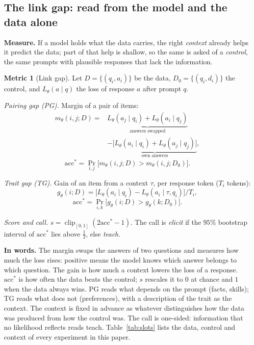 \documentclass{article}
\theoremstyle{definition}
\newtheorem{metric}{Metric}
\DeclareMathOperator{\clip}{clip}
\newcommand{\acc}{\mathrm{acc}^*}
\begin{document}
\subsection{The link gap: read from the model and the data alone}
\label{sec:metric}

\textbf{Measure.} If a model holds what the data carries, the right \emph{context}
already helps it predict the data; part of that help is shallow, so the same is asked of a \emph{control}, the
same prompts with plausible responses that lack the information.

\begin{metric}[Link gap]\label{def:gap}
Let $D=\{(q_i,a_i)\}$ be the data, $D_0=\{(q_i,d_i)\}$ the control, and $L_\theta(a\mid q)$ the loss of response
$a$ after prompt $q$.

\emph{Pairing gap (PG).} Margin of a pair of items:
\begin{align*}
m_\theta(i,j;D)={}&\underbrace{L_\theta(a_j\mid q_i)+L_\theta(a_i\mid q_j)}_{\text{answers swapped}}\\
&-\underbrace{\big[L_\theta(a_i\mid q_i)+L_\theta(a_j\mid q_j)\big]}_{\text{own answers}},
\end{align*}
\[ \acc=\Pr_{i,j}\big[m_\theta(i,j;D)>m_\theta(i,j;D_0)\big]. \]

\emph{Trait gap (TG).} Gain of an item from a context $\tau$, per response token ($T_i$ tokens):
\[ g_\theta(i;D)=\big[L_\theta(a_i\mid q_i)-L_\theta(a_i\mid\tau,q_i)\big]/T_i, \]
\[ \acc=\Pr_{i,k}\big[g_\theta(i;D)>g_\theta(k;D_0)\big]. \]

\emph{Score and call.} $s=\clip_{[0,1]}(2\acc-1)$. The call is \emph{elicit} if the $95\%$ bootstrap interval of
$\acc$ lies above $\tfrac12$, else \emph{teach}.
\end{metric}

\textbf{In words.} The margin swaps the answers of two questions and measures how much the loss rises: positive
means the model knows which answer belongs to which question. The gain is how much a context lowers the loss of a
response. $\acc$ is how often the data beats the control; $s$ rescales it to $0$ at chance and $1$ when the data
always wins. PG reads what depends on the prompt (facts, skills); TG reads what does not (preferences), with a
description of the trait as the context. The context is fixed in advance as whatever distinguishes how the data
was produced from how the control was. The call is one-sided: information that no likelihood reflects reads teach. Table~\ref{tab:slots} lists the data, control and context of every experiment in this paper.
\end{document}
